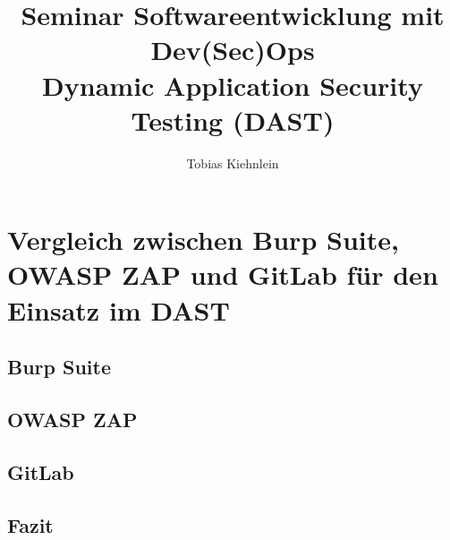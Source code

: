 \documentclass[
    paper=a4, %
    fontsize=12pt,  %
    oneside,        %
    headsepline,    %
    notitlepage     %
]{extarticle}         %
\author{Tobias Kiehnlein}
\title{\textbf{Seminar Softwareentwicklung mit Dev(Sec)Ops}\\\large{Dynamic Application Security Testing (DAST)}}
\date{}
\begin{document}
    \pagestyle{empty}
    \maketitle
    \tableofcontents
    \newpage
    \pagestyle{headings}

    
    
    

    \section{Vergleich zwischen Burp Suite, OWASP ZAP und GitLab für den Einsatz im DAST}\label{sec:vergleich-zwischen-burp-suite-owasp-zap-und-gitlab-für-den-einsatz-im-dast}

    \subsection{Burp Suite}
    \subsection{OWASP ZAP}
    \subsection{GitLab}
    \subsection{Fazit}

    \newpage
    \printbibliography[heading=bibintoc]
    \newpage
    \listoffigures
\end{document}
